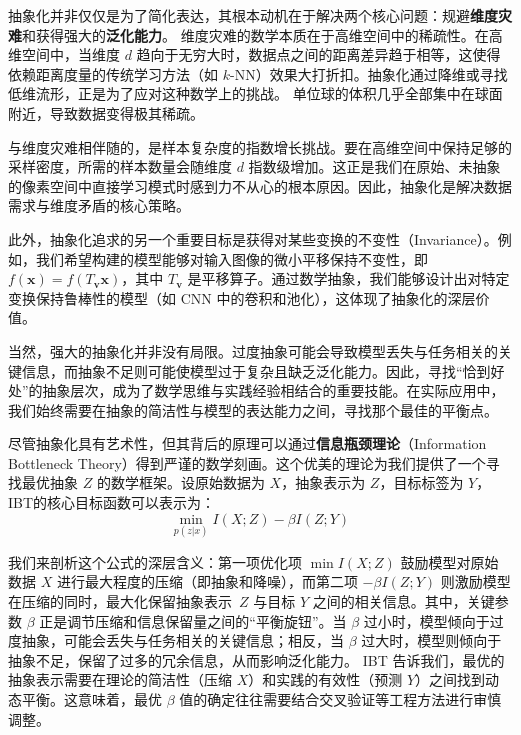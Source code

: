 抽象化并非仅仅是为了简化表达，其根本动机在于解决两个核心问题：规避\textbf{维度灾难}和获得强大的\textbf{泛化能力}。
维度灾难的数学本质在于高维空间中的稀疏性。在高维空间中，当维度 $d$ 趋向于无穷大时，数据点之间的距离差异趋于相等，这使得依赖距离度量的传统学习方法（如 $k$-NN）效果大打折扣。抽象化通过降维或寻找低维流形，正是为了应对这种数学上的挑战。 单位球的体积几乎全部集中在球面附近，导致数据变得极其稀疏。

与维度灾难相伴随的，是样本复杂度的指数增长挑战。要在高维空间中保持足够的采样密度，所需的样本数量会随维度 $d$ 指数级增加。这正是我们在原始、未抽象的像素空间中直接学习模式时感到力不从心的根本原因。因此，抽象化是解决数据需求与维度矛盾的核心策略。

此外，抽象化追求的另一个重要目标是获得对某些变换的不变性（Invariance）。例如，我们希望构建的模型能够对输入图像的微小平移保持不变性，即 $f(\mathbf{x}) = f(T_{\mathbf{v}}\mathbf{x})$，其中 $T_{\mathbf{v}}$ 是平移算子。通过数学抽象，我们能够设计出对特定变换保持鲁棒性的模型（如 CNN 中的卷积和池化），这体现了抽象化的深层价值。

当然，强大的抽象化并非没有局限。过度抽象可能会导致模型丢失与任务相关的关键信息，而抽象不足则可能使模型过于复杂且缺乏泛化能力。因此，寻找“恰到好处”的抽象层次，成为了数学思维与实践经验相结合的重要技能。在实际应用中，我们始终需要在抽象的简洁性与模型的表达能力之间，寻找那个最佳的平衡点。

尽管抽象化具有艺术性，但其背后的原理可以通过\textbf{信息瓶颈理论}（Information Bottleneck Theory）得到严谨的数学刻画。这个优美的理论为我们提供了一个寻找最优抽象 $Z$ 的数学框架。设原始数据为 $X$，抽象表示为 $Z$，目标标签为 $Y$，IBT的核心目标函数可以表示为：
$$\min_{p(z|x)} I(X;Z) - \beta I(Z;Y)$$

我们来剖析这个公式的深层含义：第一项优化项 $\min I(X;Z)$ 鼓励模型对原始数据 $X$ 进行最大程度的压缩（即抽象和降噪），而第二项 $-\beta I(Z;Y)$ 则激励模型在压缩的同时，最大化保留抽象表示~$Z$ 与目标 $Y$ 之间的相关信息。其中，关键参数 $\beta$ 正是调节压缩和信息保留量之间的“平衡旋钮”。当 $\beta$ 过小时，模型倾向于过度抽象，可能会丢失与任务相关的关键信息；相反，当 $\beta$ 过大时，模型则倾向于抽象不足，保留了过多的冗余信息，从而影响泛化能力。
IBT 告诉我们，最优的抽象表示需要在理论的简洁性（压缩 $X$）和实践的有效性（预测 $Y$）之间找到动态平衡。这意味着，最优 $\beta$ 值的确定往往需要结合交叉验证等工程方法进行审慎调整。

